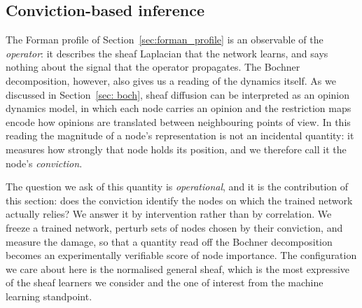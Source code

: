 %
%

\subsection{Conviction-based inference}
\label{sec:conviction}

The Forman profile of Section~\ref{sec:forman_profile} is an observable of the
\emph{operator}: it describes the sheaf Laplacian that the network learns, and
says nothing about the signal that the operator propagates. The Bochner
decomposition, however, also gives us a reading of the dynamics itself. As we
discussed in Section~\ref{sec: boch}, sheaf diffusion can be interpreted as an
opinion dynamics model, in which each node carries an opinion and the
restriction maps encode how opinions are translated between neighbouring points
of view. In this reading the magnitude of a node's representation is not an
incidental quantity: it measures how strongly that node holds its position, and
we therefore call it the node's \emph{conviction}.

The question we ask of this quantity is \emph{operational}, and it is the
contribution of this section: does the conviction identify the nodes on which
the trained network actually relies? We answer it by intervention rather than by
correlation. We freeze a trained network, perturb sets of nodes chosen by their
conviction, and measure the damage, so that a quantity read off the Bochner
decomposition becomes an experimentally verifiable score of node importance. The
configuration we care about here is the normalised general sheaf, which is the
most expressive of the sheaf learners we consider and the one of interest from
the machine learning standpoint.

